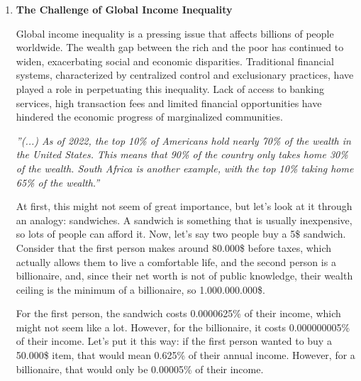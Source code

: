 \begin{enumerate}
    \item \textbf{The Challenge of Global Income Inequality}

Global income inequality is a pressing issue that affects billions of people worldwide. The wealth gap between the rich and the poor has continued to widen, exacerbating social and economic disparities. Traditional financial systems, characterized by centralized control and exclusionary practices, have played a role in perpetuating this inequality. Lack of access to banking services, high transaction fees and limited financial opportunities have hindered the economic progress of marginalized communities.

\begin{flushright}
   \textsl{''(...) As of 2022, the top 10\% of Americans hold nearly 70\% of the wealth in the United States. This means that 90\% of the country only takes home 30\% of the wealth. South Africa is another example, with the top 10\% taking home 65\% of the wealth.'' \cite{coint}} \\
\end{flushright}

\begin{comment}
    \vspace*{1cm}
        "How cryptocurrency could help tackle global income inequality", \href{https://cointelegraph.com/news/how-cryptocurrency-could-help-tackle-global-income-inequality}{Cointelegraph}
\end{comment} 


At first, this might not seem of great importance, but let's look at it through an analogy: sandwiches. A sandwich is something that is usually inexpensive, so lots of people can afford it. Now, let's say two people buy a 5\$ sandwich. Consider that the first person makes around 80.000\$ before taxes, which actually allows them to live a comfortable life, and the second person is a billionaire, and, since their net worth is not of public knowledge, their wealth ceiling is the minimum of a billionaire, so 1.000.000.000\$.\newline

For the first person, the sandwich costs 0.0000625\% of their income, which might not seem like a lot. However, for the billionaire, it costs 0.000000005\% of their income. Let's put it this way: if the first person wanted to buy a 50.000\$ item, that would mean 0.625\% of their annual income. However, for a billionaire, that would only be 0.00005\% of their income.\newline


\end{enumerate}
